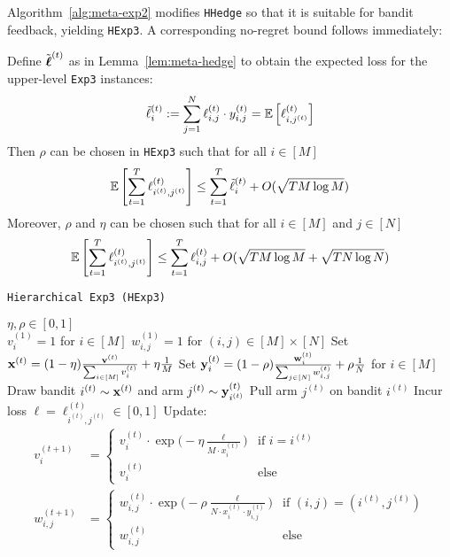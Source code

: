 Algorithm~\ref{alg:meta-exp2} modifies \texttt{HHedge} so that it is suitable for bandit feedback, yielding \texttt{HExp3}. A corresponding no-regret bound follows immediately:

\begin{lem}\label{lem:meta-exp}
	Define $\tilde{\boldsymbol\ell}^{(t)}$ as in Lemma~\ref{lem:meta-hedge} to obtain the expected loss for the upper-level \texttt{Exp3} instances:
	$$\tilde{\ell}^{(t)}_i := \sum_{j=1}^N \ell^{(t)}_{i,j}\cdot y^{(t)}_{i,j} = \operatorname*{\mathbb E}\left[ \ell^{(t)}_{i,j^{(t)}}\right]$$
	Then $\rho$ can be chosen in \texttt{HExp3} such that for all $i\in[M]$
	\begin{equation}
		\operatorname*{\mathbb E}\left[\sum_{t=1}^T\ell^{(t)}_{i^{(t)},j^{(t)}}\right]
		\leq \sum_{t=1}^T \tilde{\ell}^{(t)}_{i}
		+ O(\sqrt{T M\log M})
	\end{equation}
	Moreover, $\rho$ and $\eta$ can be chosen such that for all $i\in[M]$ and $j\in[N]$
	\begin{equation}
		\operatorname*{\mathbb E}\left[\sum_{t=1}^{T} \ell^{(t)}_{i^{(t)},j^{(t)}}\right]
		\leq \sum_{t=1}^T\ell^{(t)}_{i,j}
		+ O(\sqrt{TM \log M} + \sqrt{T N\log N})
	\end{equation}
\end{lem}


\begin{algorithm}[tb]
   \caption{\texttt{Hierarchical Exp3 (HExp3)}}
   \label{alg:meta-exp2}
   \begin{algorithmic}   
       $\eta,\rho\in[0,1]$\\
      \STATE $v^{(1)}_{i}=1$ for $i\in[M]$
   	\STATE $w^{(1)}_{i,j}=1$ for $(i,j)\in[M]\times[N]$
	   \STATE Set ${\mathbf x}^{(t)} = (1-\eta) \frac{{\mathbf v}^{(t)}}{\sum_{i\in[M]} v^{(t)}_{i}} + \eta\frac{1}{M}$
	   \STATE Set ${\mathbf y}^{(t)}_{i} = (1-\rho)\frac{{\mathbf w}^{(t)}_{i}}{\sum_{j\in[N]} w^{(t)}_{i,j}} + \rho\frac{1}{N}$ for $i\in[M]$
	\STATE Draw bandit $i^{(t)}\sim {\mathbf x}^{(t)}$ and arm $j^{(t)}\sim {\mathbf y}^{(t)}_{i^{(t)}}$
	\STATE Pull arm $j^{(t)}$ on bandit $i^{(t)}$
	   \STATE Incur loss $\ell =\ell_{i^{(t)}, j^{(t)}}^{(t)}\in [0,1]$ 
	\STATE Update:
	\begin{align}
		v^{(t+1)}_i & = \begin{cases}
			v^{(t)}_{i}\cdot 
			\exp\big(-\eta \frac{\ell}{M\cdot x_{i}^{(t)}}\big) & \text{if } i=i^{(t)} \\
			v^{(t)}_{i} & \text{else}
		\end{cases}		 
		\\
		w^{(t+1)}_{i,j} & = \begin{cases}
			w^{(t)}_{i,j}\cdot \exp\big(-\rho\frac{\ell}{N\cdot x_i^{(t)}\cdot y_{i,j}^{(t)}}\big) 
			& \text{if }(i,j)=(i^{(t)}, j^{(t)}) \\
			w^{(t)}_{i,j} &\text{else}
		\end{cases}
	\end{align}
   	\ENDFOR
   	\end{algorithmic}
\end{algorithm}


